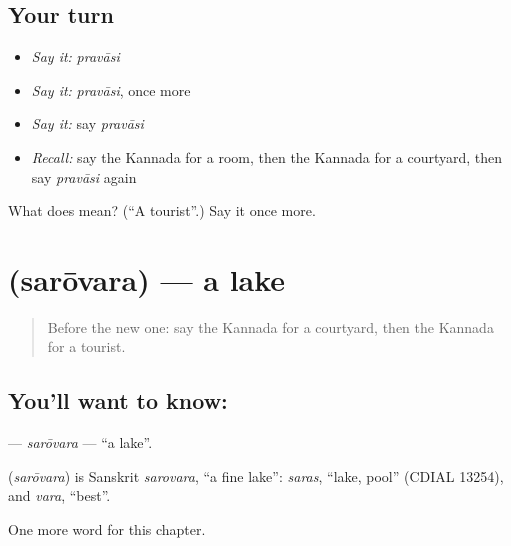 \subsection*{Your turn}
\begin{itemize}
\raggedright
  \item \emph{Say it:} \emph{pravāsi}
  \item \emph{Say it:} \emph{pravāsi}, once more
  \item \emph{Say it:} say \emph{pravāsi}
  \item \emph{Recall:} say the Kannada for a room, then the Kannada for a courtyard, then say \emph{pravāsi} again
\end{itemize}

\begin{tcolorbox}[breakable,colback=teal!4,colframe=teal!35!black,title={Before you move on}]
What does  mean? (\textquotedblleft{}A tourist\textquotedblright{}.) Say it once more.
\end{tcolorbox}
\section[\texorpdfstring{\kn{ಸರೋವರ} (sarōvara)}{ಸರೋವರ (sarōvara)}]{ (sarōvara) — a lake}

\label{lesson:KA-C174-sarovara}



\begin{quote}
Before the new one: say the Kannada for a courtyard, then the Kannada for a tourist.
\end{quote}

\subsection*{You'll want to know: }
\textbf{} — \emph{sarōvara} — \textquotedblleft{}a lake\textquotedblright{}.

\begin{cousinweb}
\textbf{} (\emph{sarōvara}) is Sanskrit \emph{sarovara}, \textquotedblleft{}a fine lake\textquotedblright{}: \emph{saras}, \textquotedblleft{}lake, pool\textquotedblright{} (CDIAL 13254), and \emph{vara}, \textquotedblleft{}best\textquotedblright{}.
\end{cousinweb}

\begin{grammarlens}[title={What you've built}]
One more word for this chapter.
\end{grammarlens}


